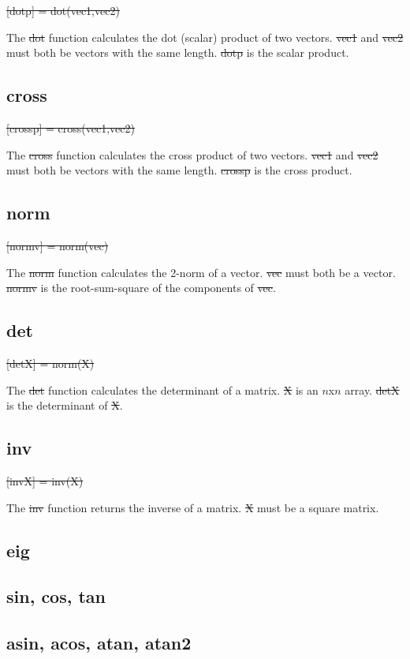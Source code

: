\st{[dotp] = dot(vec1,vec2)}

The \st{dot} function calculates the dot (scalar) product of two
vectors. \st{vec1} and \st{vec2} must both be vectors with the same
length.  \st{dotp} is the scalar product.


\subsection{cross}

\st{[crossp] = cross(vec1,vec2)}

The \st{cross} function calculates the cross product of two vectors.
\st{vec1} and \st{vec2} must both be vectors with the same length.
\st{crossp} is the cross product.

\subsection{norm}

\st{[normv] = norm(vec)}

The \st{norm} function calculates the 2-norm of a vector. \st{vec}
must both be a vector. \st{normv} is the root-sum-square of the
components of \st{vec}.

\subsection{det}

\st{[detX] = norm(X)}

The \st{det} function calculates the determinant of a matrix. \st{X}
is an $n$x$n$ array.  \st{detX} is the determinant of \st{X}.

\subsection{inv}

\st{[invX] = inv(X)}

The \st{inv} function returns the inverse of a matrix.  \st{X} must
be a square matrix.

\subsection{eig}

\subsection{sin, cos, tan}

\subsection{asin, acos, atan, atan2}

